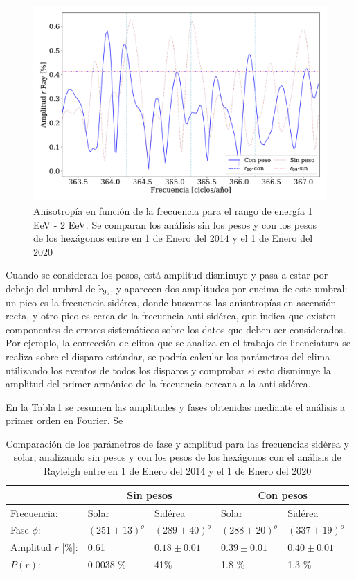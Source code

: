 		\begin{figure}[H]
			\centering
			\includegraphics[width=0.75\linewidth]{pesos_sin_con_1_2_EeV.pdf}
			\caption{Anisotropía en función de la frecuencia para el rango de energía 1  EeV - 2 EeV. Se comparan los análisis sin los pesos y con los pesos de los hexágonos entre en 1 de Enero del 2014 y el 1 de Enero del 2020}
			\label{anisotropia_rayleigh}
		\end{figure}

Cuando se consideran los pesos, está amplitud disminuye y pasa a estar por debajo del umbral de $\tilde{r}_{99}$, y aparecen dos amplitudes por encima de este umbral: un pico es la frecuencia sidérea, donde buscamos las anisotropías en ascensión recta, y otro pico es cerca de la frecuencia anti-sidérea, que indica que existen componentes de errores sistemáticos sobre los datos que deben ser considerados. Por ejemplo, la corrección de clima que se analiza en el trabajo de licenciatura se realiza sobre el disparo estándar, se podría calcular los parámetros del clima utilizando los eventos de todos los disparos y comprobar si esto disminuye la amplitud del primer armónico de la frecuencia cercana a la anti-sidérea.

		
En la Tabla\,\ref{table:parametros_rayleigh} se resumen las amplitudes y fases obtenidas mediante el análisis a primer orden en Fourier. Se
		\begin{table}[H]
		\centering
		\begin{tabular}{|l|l|l|l|l|}
			\cline{2-5}
			\multicolumn{1}{c|}{} & \multicolumn{2}{c|}{Sin pesos} 		& \multicolumn{2}{c|}{Con pesos} \\ \hline
			Frecuencia:           & Solar          & Sidérea       		& Solar         & Sidérea        \\ \hline
			Fase $\phi$:          & $(251\pm13)^o$ & $(289\pm40)^o$		& $(288\pm20)^o$& $(337\pm19)^o$            \\ \hline
			Amplitud $r$ [\%]:    & 0.61         & $0.18\pm0.01$  & $0.39\pm0.01$      & $0.40\pm0.01$         \\ \hline
			$P(r)$:               & 0.0038 \%      & 41\%          		& 1.8 \%        & 1.3 \%       \\ \hline    
		\end{tabular}
		\caption{Comparación de los parámetros de fase y amplitud para las frecuencias sidérea y solar, analizando sin pesos y con los pesos de los hexágonos con el análisis de Rayleigh entre en 1 de Enero del 2014 y el 1 de Enero del 2020}
		\label{table:parametros_rayleigh}
		\end{table}


